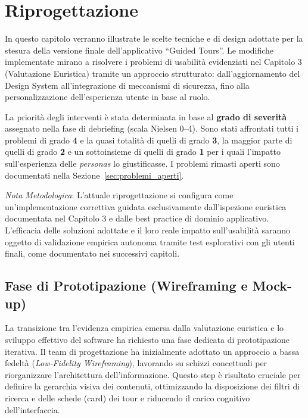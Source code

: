 \chapter{Riprogettazione}
\label{ch:riprogettazione}

In questo capitolo verranno illustrate le scelte tecniche e di design adottate per la stesura della versione finale dell'applicativo ``Guided Tours''. Le modifiche implementate mirano a risolvere i problemi di usabilità evidenziati nel Capitolo 3 (Valutazione Euristica) tramite un approccio strutturato: dall'aggiornamento del Design System all'integrazione di meccanismi di sicurezza, fino alla personalizzazione dell'esperienza utente in base al ruolo.

La priorità degli interventi è stata determinata in base al \textbf{grado di severità} assegnato nella fase di debriefing (scala Nielsen 0--4). Sono stati affrontati tutti i problemi di grado \textbf{4} e la quasi totalità di quelli di grado \textbf{3}, la maggior parte di quelli di grado \textbf{2} e un sottoinsieme di quelli di grado \textbf{1} per i quali l'impatto sull'esperienza delle \textit{personas} lo giustificasse. I problemi rimasti aperti sono documentati nella Sezione~\ref{sec:problemi_aperti}.

\vspace{1em}
\noindent\textit{Nota Metodologica}: L'attuale riprogettazione si configura come un'implementazione correttiva guidata esclusivamente dall'ispezione euristica documentata nel Capitolo 3 e dalle best practice di dominio applicativo. L'efficacia delle soluzioni adottate e il loro reale impatto sull'usabilità saranno oggetto di validazione empirica autonoma tramite test esplorativi con gli utenti finali, come documentato nei successivi capitoli.

\section{Fase di Prototipazione (Wireframing e Mock-up)}
La transizione tra l'evidenza empirica emersa dalla valutazione euristica e lo sviluppo effettivo del software ha richiesto una fase dedicata di prototipazione iterativa. Il team di progettazione ha inizialmente adottato un approccio a bassa fedeltà (\textit{Low-Fidelity Wireframing}), lavorando su schizzi concettuali per riorganizzare l'architettura dell'informazione. Questo step è risultato cruciale per definire la gerarchia visiva dei contenuti, ottimizzando la disposizione dei filtri di ricerca e delle schede (card) dei tour e riducendo il carico cognitivo dell'interfaccia.

